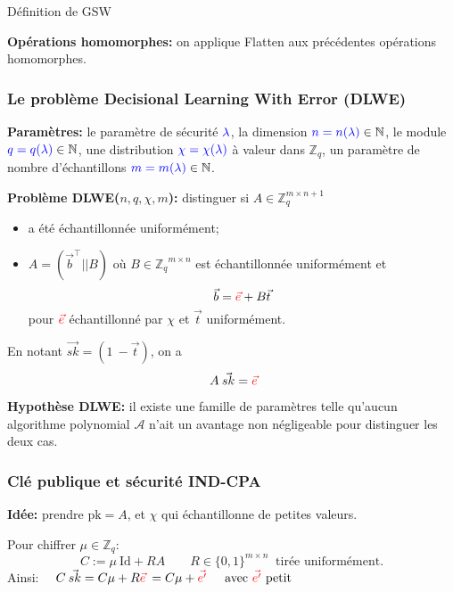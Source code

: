\documentclass[10pt,xcolor={usenames,dvipsnames}]{beamer}
\newcommand{\ZZq}{\mathbb{Z}_q}
\begin{document}
\begin{section}{Définition de GSW}
\begin{frame}
\textbf{Opérations homomorphes:} on applique Flatten aux précédentes opérations homomorphes.

\end{frame} 
  
  
\begin{frame} 
\frametitle{Le problème Decisional Learning With Error (DLWE)}
\textbf{Paramètres:} le paramètre de sécurité $\color{blue}\lambda$,
la dimension ${\color{blue}n = n(\lambda)} \in \mathbb{N}$,
le module ${\color{blue}q = q(\lambda)} \in \mathbb{N}$,
une distribution ${\color{blue}\chi = \chi(\lambda)}$ à valeur dans $\ZZq$,
un paramètre de nombre d'échantillons ${\color{blue}m = m(\lambda)}\in \mathbb{N}$.

\textbf{Problème DLWE($n, q, \chi, m$):} 
distinguer si $A \in \ZZq^{m \times n+1}$ 
\begin{itemize}
\item a été échantillonnée uniformément; 
\item $A = (\vec{b}^\intercal ||B)$ où $B\in {\ZZq}^{m \times n}$
est échantillonnée uniformément et 
\[\vec{b} = {\color{red}\vec{e}} + B \vec{t}\]
pour  $\color{red}\vec{e}$ échantillonné par $\chi$ et $\vec{t}$ uniformément.
\end{itemize}

En notant $\vec{sk} = (1\: -\vec{t})$, on a
\[ A \:\vec{sk} = {\color{red}\vec{e}} \]


\textbf{Hypothèse DLWE:} il existe une famille de paramètres telle qu'aucun algorithme polynomial
$\mathcal{A}$ n'ait un avantage non négligeable pour distinguer les deux cas.
\end{frame} 



\begin{frame} 
\frametitle{Clé publique et sécurité IND-CPA}
\textbf{Idée:} prendre $\text{pk}= A$, et $\chi$ qui échantillonne de petites valeurs.

Pour chiffrer $\mu \in \ZZq$:
\[ C :=\mu\:\text{Id} + RA \qquad R\in {\{0,1\}}^{m \times n}\: \text{ tirée uniformément.} \]
Ainsi: $\quad C\:\vec{sk} = C \mu +  R {\color{red}\vec{e}}\:= C \mu + {\color{red}\vec{e'}}
\quad\:\: \text{avec } {\color{red}\vec{e'}} \text{ petit}$



\end{frame}
\end{section}
\end{document}
